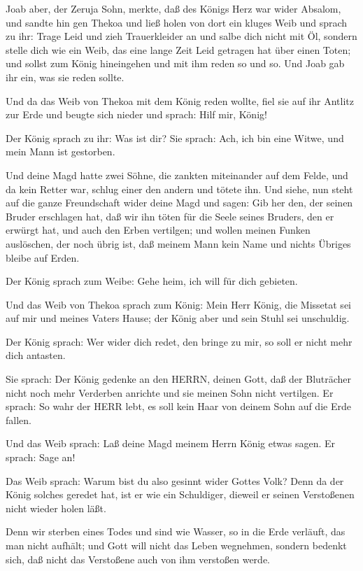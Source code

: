  Joab aber, der Zeruja Sohn, merkte, daß des Königs Herz war
wider Absalom,  und sandte hin gen Thekoa und ließ holen von
dort ein kluges Weib und sprach zu ihr: Trage Leid und zieh
Trauerkleider an und salbe dich nicht mit Öl, sondern stelle dich wie
ein Weib, das eine lange Zeit Leid getragen hat über einen Toten;
 und sollst zum König hineingehen und mit ihm reden so und
so. Und Joab gab ihr ein, was sie reden sollte.

 Und da das Weib von Thekoa mit dem König reden wollte, fiel
sie auf ihr Antlitz zur Erde und beugte sich nieder und sprach: Hilf
mir, König!

 Der König sprach zu ihr: Was ist dir? Sie sprach: Ach, ich
bin eine Witwe, und mein Mann ist gestorben.

 Und deine Magd hatte zwei Söhne, die zankten miteinander
auf dem Felde, und da kein Retter war, schlug einer den andern und
tötete ihn.  Und siehe, nun steht auf die ganze Freundschaft
wider deine Magd und sagen: Gib her den, der seinen Bruder erschlagen
hat, daß wir ihn töten für die Seele seines Bruders, den er erwürgt hat,
und auch den Erben vertilgen; und wollen meinen Funken auslöschen, der
noch übrig ist, daß meinem Mann kein Name und nichts Übriges bleibe auf
Erden.

 Der König sprach zum Weibe: Gehe heim, ich will für dich
gebieten.

 Und das Weib von Thekoa sprach zum König: Mein Herr König,
die Missetat sei auf mir und meines Vaters Hause; der König aber und
sein Stuhl sei unschuldig.

 Der König sprach: Wer wider dich redet, den bringe zu mir,
so soll er nicht mehr dich antasten.

 Sie sprach: Der König gedenke an den HERRN, deinen Gott,
daß der Bluträcher nicht noch mehr Verderben anrichte und sie meinen
Sohn nicht vertilgen. Er sprach: So wahr der HERR lebt, es soll kein
Haar von deinem Sohn auf die Erde fallen.

 Und das Weib sprach: Laß deine Magd meinem Herrn König
etwas sagen. Er sprach: Sage an!

 Das Weib sprach: Warum bist du also gesinnt wider Gottes
Volk? Denn da der König solches geredet hat, ist er wie ein Schuldiger,
dieweil er seinen Verstoßenen nicht wieder holen läßt.

 Denn wir sterben eines Todes und sind wie Wasser, so in
die Erde verläuft, das man nicht aufhält; und Gott will nicht das Leben
wegnehmen, sondern bedenkt sich, daß nicht das Verstoßene auch von ihm
verstoßen werde.

